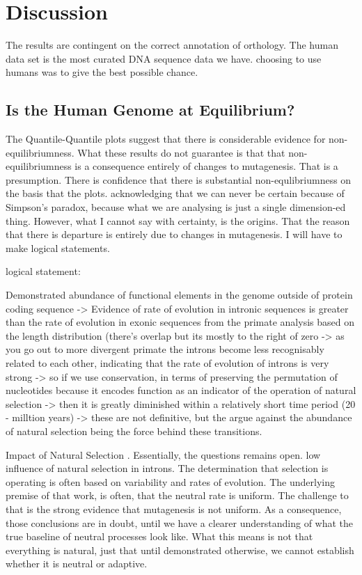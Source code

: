 \chapter{Discussion}

The results are contingent on the correct annotation of orthology. The human data set is the most curated DNA sequence data we have. choosing to use humans was to give the best possible chance.




\section{Is the Human Genome at Equilibrium?}



The Quantile-Quantile plots suggest that there is considerable evidence for non-equilibriumness. What these results do not guarantee is that that non-equilibriumness is a consequence entirely of changes to mutagenesis. That is a presumption. There is confidence that there is substantial non-equlibriumness on the basis that the plots. acknowledging that we can never be certain because of Simpson's paradox, because what we are analysing is just a single dimension-ed thing. However, what I cannot say with certainty, is the origins. That the reason that there is departure is entirely due to changes in mutagenesis. I will have to make logical statements. 

logical statement: 

Demonstrated abundance of functional elements in the genome outside of protein coding sequence -> Evidence of rate of evolution in intronic sequences is greater than the rate of evolution in exonic sequences from the primate analysis based on the length distribution (there's overlap but its mostly to the right of zero -> as you go out to more divergent primate the introns become less recognisably related to each other, indicating that the rate of evolution of introns is very strong -> so if we use conservation, in terms of preserving the permutation of nucleotides because it encodes function as an indicator of the operation of natural selection -> then it is greatly diminished within a relatively short time period (20 - milltion years) -> these are not definitive, but the argue against the abundance of natural selection being the force behind these transitions.

Impact of Natural Selection \cite{Graur2013OnENCODE}. Essentially, the questions remains open. 
low influence of natural selection in introns. 
The determination that selection is operating is often based on variability and rates of evolution. The underlying premise of that work, is often, that the neutral rate is uniform. The challenge to that is the strong evidence that mutagenesis is not uniform. As a consequence, those conclusions are in doubt, until we have a clearer understanding of what the true baseline of neutral processes look like. What this means is not that everything is natural, just that until demonstrated otherwise, we cannot establish whether it is neutral or adaptive. 

